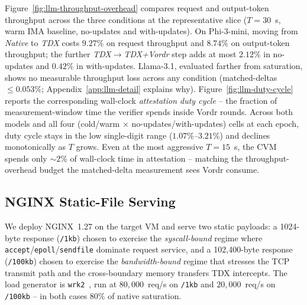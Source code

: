 Figure~\ref{fig:llm-throughput-overhead} compares request and
output-token throughput across the three conditions at the
representative slice ($T{=}30$~s, warm IMA baseline, no-updates and
with-updates). On Phi-3-mini, moving from \emph{Native} to \emph{TDX}
costs $9.27\%$ on request throughput and $8.74\%$ on output-token
throughput; the further \emph{TDX$\rightarrow$TDX+Vordr} step adds at
most $2.12\%$ in no-updates and $0.42\%$ in with-updates. Llama-3.1,
evaluated farther from saturation, shows no measurable throughput loss
across any condition (matched-deltas $\le 0.053\%$;
Appendix~\ref{app:llm-detail} explains why).
Figure~\ref{fig:llm-duty-cycle} reports the corresponding wall-clock
\emph{attestation duty cycle} -- the fraction of measurement-window
time the verifier spends inside Vordr rounds. Across both models and
all four (cold/warm $\times$ no-updates/with-updates) cells at each epoch,
duty cycle stays in the low single-digit range ($1.07\%$--$3.21\%$)
and declines monotonically as $T$ grows. Even at the most aggressive
$T{=}15$~s, the CVM spends only $\sim$$2\%$ of wall-clock time in
attestation -- matching the throughput-overhead budget the matched-delta
measurement sees Vordr consume.

\subsection{NGINX Static-File Serving}
\label{sec:eval-nginx}

We deploy NGINX~1.27 on the target VM and serve two static payloads:
a 1024-byte response (\texttt{/1kb}) chosen to exercise the
\emph{syscall-bound} regime where
\texttt{accept}/\texttt{epoll}/\texttt{sendfile} dominate request
service, and a 102{,}400-byte response (\texttt{/100kb}) chosen to
exercise the \emph{bandwidth-bound} regime that stresses the TCP
transmit path and the cross-boundary memory transfers TDX
intercepts. The load generator is \texttt{wrk2}~\cite{wrk2}, run at
$80{,}000$~req/s on \texttt{/1kb} and $20{,}000$~req/s on
\texttt{/100kb} -- in both cases $80\%$ of native saturation.

